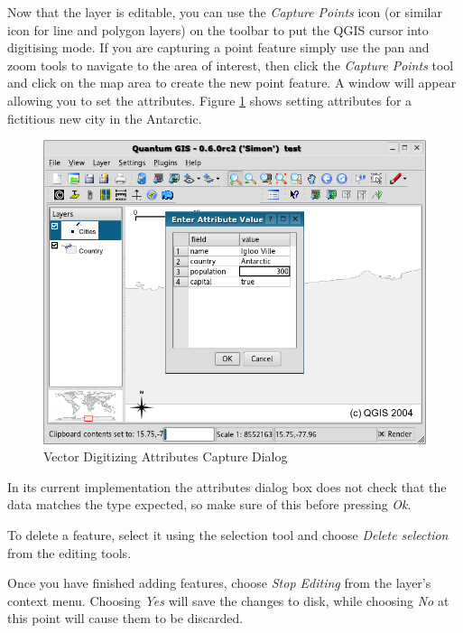 Now that the layer is editable, you can use the \textit{Capture Points} icon (or
similar icon for line and polygon layers) on the toolbar to put the QGIS cursor
into digitising mode. If you are capturing a point feature simply use the pan
and zoom tools to navigate to the area of interest, then click the
\textit{Capture Points} tool and click on the map area to create the  
new point feature. A window will appear allowing you to set the attributes.
Figure \ref{fig:vector_digitising} shows setting attributes for a fictitious
new city in the Antarctic.

\begin{figure}[h]
   \begin{center}
   \caption{Vector Digitizing Attributes Capture Dialog}\label{fig:vector_digitising}\smallskip
   \includegraphics[scale=.5]{qgis_user_guide_images/digitising_attributes}
\end{center}  
\end{figure}

In its current implementation the attributes dialog box does not check that the
data matches the type expected, so make sure of this before
pressing \textit{Ok}. 

To delete a feature, select it using the selection tool and choose
\textit{Delete selection} from the editing tools.

Once you have finished adding features, choose \textit{Stop Editing} from the
layer's context menu. Choosing \textit{Yes} will save the changes to disk, while
choosing \textit{No} at this point will cause them to be discarded.

